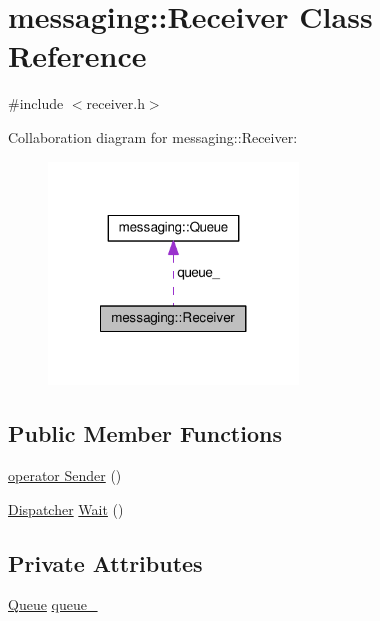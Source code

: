 \hypertarget{classmessaging_1_1Receiver}{\section{messaging\-:\-:Receiver Class Reference}
\label{classmessaging_1_1Receiver}
}


{\ttfamily \#include $<$receiver.\-h$>$}



Collaboration diagram for messaging\-:\-:Receiver\-:
\nopagebreak
\begin{figure}[H]
\begin{center}
\leavevmode
\includegraphics[width=188pt]{classmessaging_1_1Receiver__coll__graph}
\end{center}
\end{figure}
\subsection*{Public Member Functions}
\begin{DoxyCompactItemize}
\item 
\hyperlink{classmessaging_1_1Receiver_a032cf4096825d90ae51404c8655db6f0}{operator Sender} ()
\item 
\hyperlink{classmessaging_1_1Dispatcher}{Dispatcher} \hyperlink{classmessaging_1_1Receiver_a3f0e7b541159793eaec1e0fa6802d4d2}{Wait} ()
\end{DoxyCompactItemize}
\subsection*{Private Attributes}
\begin{DoxyCompactItemize}
\item 
\hyperlink{classmessaging_1_1Queue}{Queue} \hyperlink{classmessaging_1_1Receiver_a5d1deaa42acaabf2837860e9672dc2d3}{queue\-\_\-}
\end{DoxyCompactItemize}


